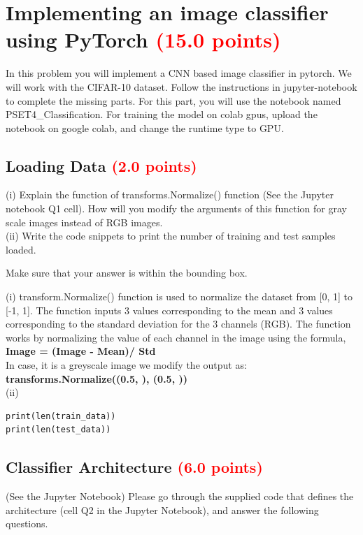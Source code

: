 \documentclass[answers]{exam}
\newcommand{\mypoints}[1]{\textcolor{red}{(#1 points)}}
\begin{document}
\newpage

\section{Implementing an image classifier using PyTorch \mypoints{15.0}}
In this problem you will implement a CNN based image classifier in pytorch. We will work with the CIFAR-10 dataset. Follow the instructions in jupyter-notebook to complete the missing parts. For this part, you will use the notebook named PSET4\_Classification. For training the model on colab gpus, upload the notebook on google colab, and change the runtime type to GPU. 

\subsection{Loading Data \mypoints{2.0}}
(i) Explain the function of transforms.Normalize() function (See the Jupyter notebook Q1 cell). How will you modify the arguments of this function for gray scale images instead of RGB images. \\
(ii) Write the code snippets to print the number of training and test samples loaded. 

Make sure that your answer is within the bounding box.
\begin{solution}
(i) transform.Normalize() function is used to normalize the dataset from [0, 1] to [-1, 1]. The function inputs 3 values corresponding to the mean and 3 values corresponding to the standard deviation for the 3 channels (RGB). The function works by normalizing the value of each channel in the image using the formula,\\
\textbf{Image = (Image - Mean)/ Std}\\
In case, it is a greyscale image we modify the output as:\\
\textbf{transforms.Normalize((0.5, ), (0.5, ))}\\

(ii)
\begin{verbatim}
print(len(train_data))
print(len(test_data))
\end{verbatim}
\end{solution}

\subsection{Classifier Architecture \mypoints{6.0}}
(See the Jupyter Notebook) Please  go  through  the  supplied  code  that defines the architecture (cell Q2 in the Jupyter Notebook), and answer the following questions. 
\end{document}
